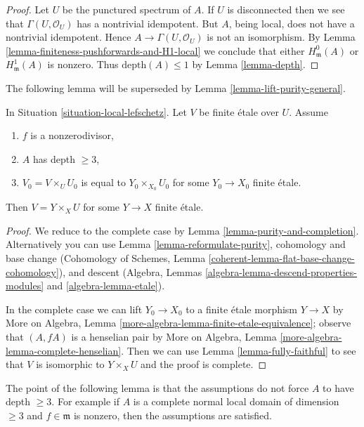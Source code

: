 \begin{proof}
Let $U$ be the punctured spectrum of $A$.
If $U$ is disconnected then we see that
$\Gamma(U, \mathcal{O}_U)$ has a nontrivial idempotent.
But $A$, being local, does not have a nontrivial idempotent.
Hence $A \to \Gamma(U, \mathcal{O}_U)$ is not an isomorphism.
By Lemma \ref{lemma-finiteness-pushforwards-and-H1-local}
we conclude that either $H^0_\mathfrak m(A)$ or $H^1_\mathfrak m(A)$
is nonzero. Thus $\text{depth}(A) \leq 1$ by
Lemma \ref{lemma-depth}.
\end{proof}

\noindent
The following lemma will be superseded by
Lemma \ref{lemma-lift-purity-general}.

\begin{lemma}
\label{lemma-lift-purity}
In Situation \ref{situation-local-lefschetz}.
Let $V$ be finite \'etale over $U$. Assume
\begin{enumerate}
\item $f$ is a nonzerodivisor,
\item $A$ has depth $\geq 3$,
\item $V_0 = V \times_U U_0$ is equal to $Y_0 \times_{X_0} U_0$
for some $Y_0 \to X_0$ finite \'etale.
\end{enumerate}
Then $V = Y \times_X U$ for some $Y \to X$ finite \'etale.
\end{lemma}

\begin{proof}
We reduce to the complete case by Lemma \ref{lemma-purity-and-completion}.
Alternatively you can use Lemma \ref{lemma-reformulate-purity},
cohomology and base change
(Cohomology of Schemes, Lemma
\ref{coherent-lemma-flat-base-change-cohomology}), and descent
(Algebra, Lemmas \ref{algebra-lemma-descend-properties-modules} and
\ref{algebra-lemma-etale}).

\medskip\noindent
In the complete case we can lift $Y_0 \to X_0$ to a finite
\'etale morphism $Y \to X$ by
More on Algebra, Lemma \ref{more-algebra-lemma-finite-etale-equivalence};
observe that $(A, fA)$ is a henselian pair by
More on Algebra, Lemma \ref{more-algebra-lemma-complete-henselian}.
Then we can use Lemma \ref{lemma-fully-faithful}
to see that $V$ is isomorphic to $Y \times_X U$ and
the proof is complete.
\end{proof}

\noindent
The point of the following lemma is that the assumptions do not force
$A$ to have depth $\geq 3$. For example if $A$ is a complete normal
local domain of dimension $\geq 3$ and $f \in \mathfrak m$ is nonzero,
then the assumptions are satisfied.

